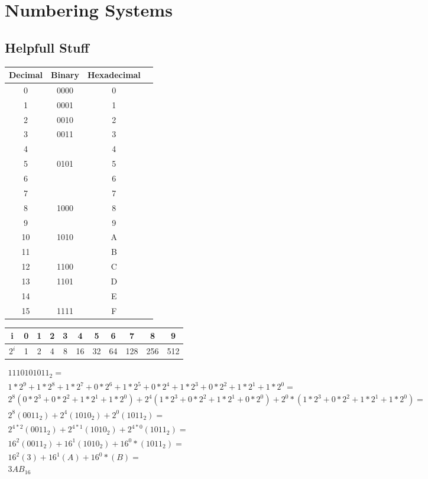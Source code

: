 \chapter{Numbering Systems}
\graphicspath{ {./chapter01/FigWork} }

\section{Helpfull Stuff}

\begin{tabular}{|c|c|c|c|}\hline
Decimal & Binary & Hexadecimal \\ \hline
0	& 0000	& 0	 \\ \hline
1	& 0001	& 1	 \\ \hline
2	& 0010	& 2	 \\ \hline
3	& 0011	& 3	 \\ \hline
4	& 		& 4	 \\ \hline
5	& 0101	& 5	 \\ \hline
6	& 		& 6	 \\ \hline
7	& 		& 7	 \\ \hline
8	& 1000	& 8	 \\ \hline
9	& 		& 9	 \\ \hline
10	& 1010	& A	 \\ \hline
11	& 		& B	 \\ \hline
12	& 1100	& C	 \\ \hline
13	& 1101	& D	 \\ \hline
14	& 		& E	 \\ \hline
15	& 1111	& F	 \\ \hline
\end{tabular}
\vspace{0.5in}



\begin{tabular}{|c|c|c|c|c|c|c|c|c|c|c|}\hline
i    & 0 & 1 &  2 &  3 &  4 &  5 &  6 &  7  &  8  &  9  \\ \hline
$2^i$ & 1 & 2 &  4 &  8 & 16 & 32 & 64 & 128 & 256 &  512\\ \hline
\end{tabular}
\vspace{0.5in}

{\tiny
$\begin{array}{l}
1110101011_2= \\
1*2^9+1*2^8+1*2^7+0*2^6+1*2^5+0*2^4+1*2^3+0*2^2+1*2^1+1*2^0 = \\
2^8(0*2^3+0*2^2+1*2^1+1*2^0) + 2^4(1*2^3+0*2^2+1*2^1+0*2^0) + 2^0*(1*2^3+0*2^2+1*2^1+1*2^0) =\\
2^8(0011_2) + 2^4(1010_2) +  2^0(1011_2) =\\
2^{4*2}(0011_2) + 2^{4*1}(1010_2) +  2^{4*0}(1011_2) =\\
16^2(0011_2) + 16^1(1010_2) + 16^0*(1011_2) =\\
16^2(3) + 16^1(A) + 16^0*(B) =\\
3AB_{16}
\end{array}$
}



